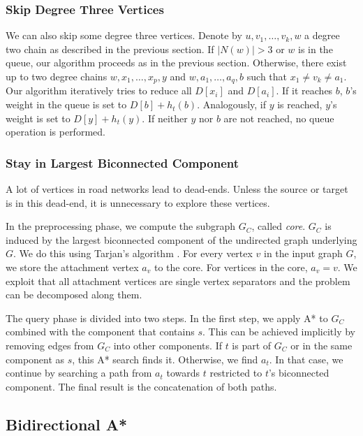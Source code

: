\documentclass[manuscript,review]{acmart}
\begin{document}
\subsubsection{Skip Degree Three Vertices}

We can also skip some degree three vertices.
Denote by $u, v_1,\ldots, v_k, w$ a degree two chain as described in the previous section.
If $|N(w)| > 3$ or $w$ is in the queue, our algorithm proceeds as in the previous section.
Otherwise, there exist up to two degree chains $w, x_1,\ldots,x_p, y$ and $w,a_1,\ldots,a_q,b$ such that $x_1\neq v_k \neq a_1$.
Our algorithm iteratively tries to reduce all $D[x_i]$ and $D[a_i]$.
If it reaches $b$, $b$'s weight in the queue is set to $D[b]+h_t(b)$.
Analogously, if $y$ is reached, $y$'s weight is set to $D[y]+h_t(y)$.
If neither $y$ nor $b$ are not reached, no queue operation is performed.

\subsubsection{Stay in Largest Biconnected Component}\label{sec:largested-biconnected-component}

A lot of vertices in road networks lead to dead-ends.
Unless the source or target is in this dead-end, it is unnecessary to explore these vertices.

In the preprocessing phase, we compute the subgraph $G_C$, called \emph{core}.
$G_C$ is induced by the largest biconnected component of the undirected graph underlying $G$.
We do this using Tarjan's algorithm \cite{t-dfslg2-72}.
For every vertex $v$ in the input graph $G$, we store the attachment vertex $a_v$ to the core.
For vertices in the core, $a_v=v$.
We exploit that all attachment vertices are single vertex separators and the problem can be decomposed along them.

The query phase is divided into two steps.
In the first step, we apply A* to $G_C$ combined with the component that contains $s$.
This can be achieved implicitly by removing edges from $G_C$ into other components.
If $t$ is part of $G_C$ or in the same component as $s$, this A* search finds it.
Otherwise, we find $a_t$.
In that case, we continue by searching a path from $a_t$ towards $t$ restricted to $t$'s biconnected component.
The final result is the concatenation of both paths.

\subsection{Bidirectional A*}\label{sec:bidir_astar}
\end{document}
